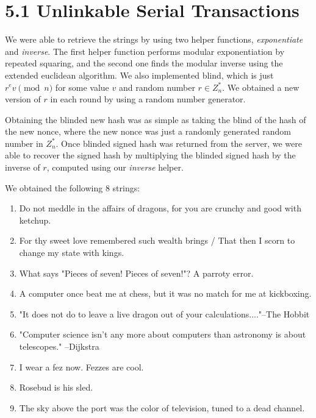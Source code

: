 \section{5.1 Unlinkable Serial Transactions}

We were able to retrieve the strings by using two helper functions, \emph{exponentiate} and \emph{inverse}. The first helper function performs modular exponentiation by repeated squaring, and the second one finds the modular inverse using the extended euclidean algorithm. We also implemented blind, which is just $r^e v \pmod{n}$ for some value $v$ and random number $r \in Z_{n}^*$. We obtained a new version of $r$ in each round by using a random number generator.

Obtaining the blinded new hash was as simple as taking the blind of the hash of the new nonce, where the new nonce was just a randomly generated random number in $Z_{n}^*$. Once blinded signed hash was returned from the server, we were able to recover the signed hash by multiplying the blinded signed hash by the inverse of $r$, computed using our \emph{inverse} helper.

We obtained the following 8 strings:

\begin{enumerate}
  \item Do not meddle in the affairs of dragons, for you are crunchy and good with ketchup.
  \item For thy sweet love remembered such wealth brings / That then I scorn to change my state with kings.
  \item What says "Pieces of seven!  Pieces of seven!"?  A parroty error.
  \item A computer once beat me at chess, but it was no match for me at kickboxing.
  \item "It does not do to leave a live dragon out of your calculations...."--The Hobbit
  \item "Computer science isn't any more about computers than astronomy is about telescopes." --Dijkstra
  \item I wear a fez now.  Fezzes are cool.
  \item Rosebud is his sled.
  \item The sky above the port was the color of television, tuned to a dead channel.
\end{enumerate}
